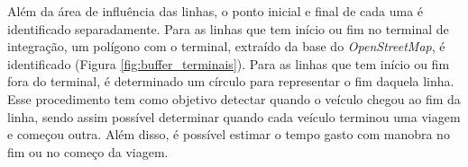\documentclass[        
    a4paper,          %
    12pt,             %
    chapter=TITLE,    %
    section=Title,    %
    subsection=Title, %
    oneside,          %
    english,          %
    spanish,          %
    brazil,           %
    fleqn             %
]{abntex2}
\begin{document}
  \begin{figure}[!h]
  \captionsetup{width=16cm}
  \centering
  \end{figure}
  
  Além da área de influência das linhas, o ponto inicial e final de cada uma é identificado separadamente. Para as linhas que tem início ou fim no terminal de integração, um polígono com o terminal, extraído da base do \emph{OpenStreetMap}, é identificado (Figura \ref{fig:buffer_terminais}). Para as linhas que tem início ou fim fora do terminal, é determinado um círculo para representar o fim daquela linha. Esse procedimento tem como objetivo detectar quando o veículo chegou ao fim da linha, sendo assim possível determinar quando cada veículo terminou uma viagem e começou outra. Além disso, é possível estimar o tempo gasto com manobra no fim ou no começo da viagem.
  
  \begin{figure}[!h]
  \captionsetup{width=16cm}
  \centering
  \end{figure}
  
\end{document}
